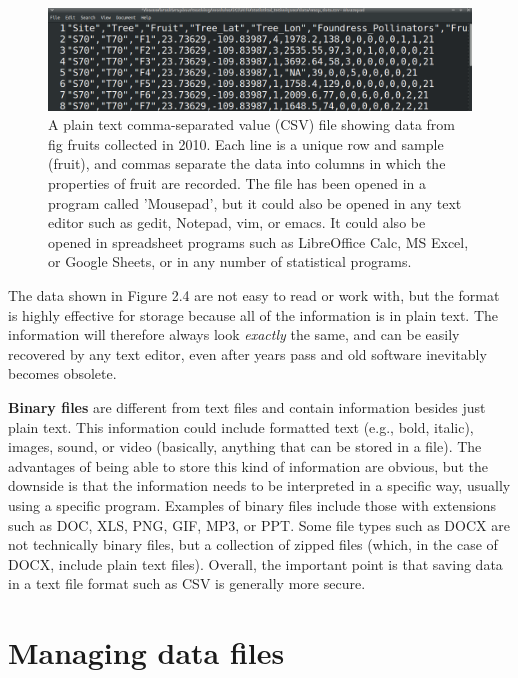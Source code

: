 \documentclass[
]{scrbook}
\begin{document}
\begin{figure}
\includegraphics[width=1\linewidth]{img/wasp_data_csv} \caption{A plain text comma-separated value (CSV) file showing data from fig fruits collected in 2010. Each line is a unique row and sample (fruit), and commas separate the data into columns in which the properties of fruit are recorded. The file has been opened in a program called 'Mousepad', but it could also be opened in any text editor such as gedit, Notepad, vim, or emacs. It could also be opened in spreadsheet programs such as LibreOffice Calc, MS Excel, or Google Sheets, or in any number of statistical programs.}\label{fig:unnamed-chunk-7}
\end{figure}

The data shown in Figure 2.4 are not easy to read or work with, but the format is highly effective for storage because all of the information is in plain text.
The information will therefore always look \emph{exactly} the same, and can be easily recovered by any text editor, even after years pass and old software inevitably becomes obsolete.

\textbf{Binary files} are different from text files and contain information besides just plain text.
This information could include formatted text (e.g., bold, italic), images, sound, or video (basically, anything that can be stored in a file).
The advantages of being able to store this kind of information are obvious, but the downside is that the information needs to be interpreted in a specific way, usually using a specific program.
Examples of binary files include those with extensions such as DOC, XLS, PNG, GIF, MP3, or PPT.
Some file types such as DOCX are not technically binary files, but a collection of zipped files (which, in the case of DOCX, include plain text files).
Overall, the important point is that saving data in a text file format such as CSV is generally more secure.

\hypertarget{managing-data-files}{%
\section{Managing data files}\label{managing-data-files}}
\end{document}
